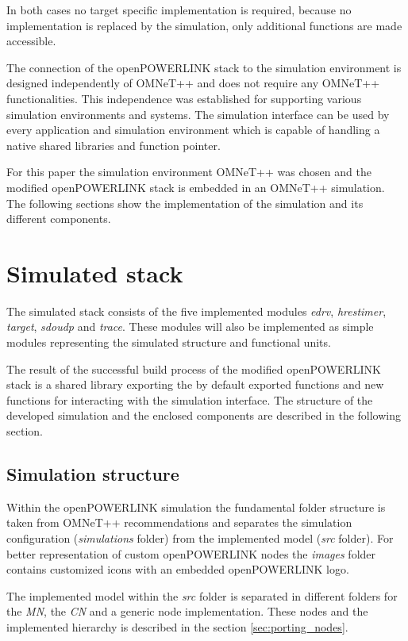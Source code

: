 In both cases no target specific implementation is required, because no implementation is replaced by the simulation, only additional functions are made accessible.

The connection of the openPOWERLINK stack to the simulation environment is designed independently of OMNeT++ and does not require any OMNeT++ functionalities.
This independence was established for supporting various simulation environments and systems.
The simulation interface can be used by every application and simulation environment which is capable of handling a native shared libraries and function pointer.

For this paper the simulation environment OMNeT++ was chosen and the modified openPOWERLINK stack is embedded in an OMNeT++ simulation.
The following sections show the implementation of the simulation and its different components.

\section{Simulated stack}
\label{sec:porting_stack}
The simulated stack consists of the five implemented modules \emph{edrv}, \emph{hrestimer}, \emph{target}, \emph{sdoudp} and \emph{trace}.
These modules will also be implemented as simple modules representing the simulated structure and functional units.

The result of the successful build process of the modified openPOWERLINK stack is a shared library exporting the by default exported functions and new functions for interacting with the simulation interface.
The structure of the developed simulation and the enclosed components are described in the following section.

\subsection{Simulation structure}
\label{sec:porting_stack_simstructure}
Within the openPOWERLINK simulation the fundamental folder structure is taken from OMNeT++ recommendations and separates the simulation configuration (\emph{simulations} folder) from the implemented model (\emph{src} folder).
For better representation of custom openPOWERLINK nodes the \emph{images} folder contains customized icons with an embedded openPOWERLINK logo.

The implemented model within the \emph{src} folder is separated in different folders for the \emph{MN}, the \emph{CN} and a generic node implementation.
These nodes and the implemented hierarchy is described in the section \ref{sec:porting_nodes}.

